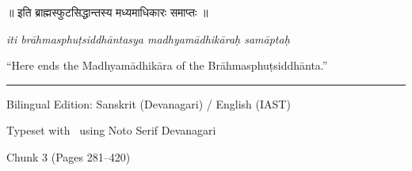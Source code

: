 \documentclass[11pt,a4paper]{article}
\newcommand{\dev}[1]{{\devanagarifont #1}}
\theoremstyle{definition}
\begin{document}
\begin{center}
\begin{minipage}{0.85\textwidth}
\centering
{\large\dev{॥ इति ब्राह्मस्फुटसिद्धान्तस्य मध्यमाधिकारः समाप्तः ॥}}

\vspace{0.5cm}
\textit{iti br\=ahmasphu\d{t}siddh\=antasya madhyam\=adhik\=ara\d{h} sam\=apta\d{h}}

\vspace{0.5cm}
``Here ends the Madhyam\=adhik\=ara of the Br\=ahmasphu\d{t}siddh\=anta.''

\vspace{1.5cm}
\rule{0.6\textwidth}{0.4pt}

\vspace{0.5cm}
{\small Bilingual Edition: Sanskrit (Devanagari) / English (IAST)}

\vspace{0.3cm}
{\small Typeset with \XeLaTeX\ using Noto Serif Devanagari}

\vspace{0.3cm}
{\small Chunk 3 (Pages 281--420)}
\end{minipage}
\end{center}
\end{document}
